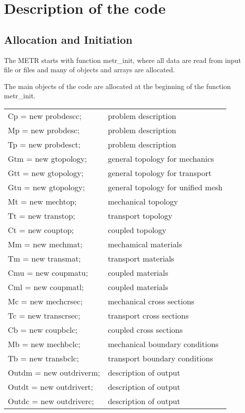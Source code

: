 \chapter{Description of the code}

\section{Allocation and Initiation}

The METR starts with function metr\_init, where all data are read
from input file or files and many of objects and arrays are allocated.

The main objects of the code are allocated at the beginning
of the function metr\_init.
\begin{center}
\begin{tabular}{ll}
Cp = new probdescc;  & problem description
\\
Mp  = new probdesc;  & problem description
\\
Tp  = new probdesct;  & problem description
\\
Gtm = new gtopology; & general topology for mechanics
\\
Gtt = new gtopology; & general topology for transport
\\
Gtu = new gtopology; & general topology for unified mesh
\\
Mt  = new mechtop; & mechanical topology
\\
Tt  = new transtop; & transport topology
\\
Ct = new couptop; & coupled topology
\\
Mm  = new mechmat; & mechamical materials
\\
Tm  = new transmat; & transport materials
\\
Cmu = new coupmatu; & coupled materials
\\
Cml = new coupmatl; & coupled materials
\\
Mc  = new mechcrsec; & mechanical cross sections
\\
Tc  = new transcrsec; & transport cross sections
\\
Cb = new coupbclc; & coupled cross sections
\\
Mb  = new mechbclc; & mechanical boundary conditions
\\
Tb  = new transbclc; & transport boundary conditions
\\
Outdm = new outdriverm; & description of output
\\
Outdt = new outdrivert; & description of output
\\
Outdc = new outdriverc; & description of output
\end{tabular}
\end{center}


